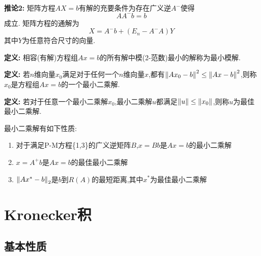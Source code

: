 \documentclass{matrix-review}
\begin{document}
\textbf{推论2\important :} 矩阵方程$AX=b$有解的充要条件为存在广义逆$A^-$使得\begin{equation}
    AA^-b=b
\end{equation}成立. 矩阵方程的通解为\begin{equation}
    X=A^-b+(E_n-A^-A)Y
\end{equation}其中$Y$为任意符合尺寸的向量.

\textbf{定义:} 相容(有解)方程组$Ax=b$的所有解中模(2-范数)最小的解称为最小模解.

\textbf{定义:} 若$n$维向量$x_0$满足对于任何一个$n$维向量$x$,都有$\left\lVert Ax_0-b \right\rVert^2\le\left\lVert Ax-b \right\rVert^2$,则称$x_0$是方程组$Ax=b$的一个最小二乘解.

\textbf{定义:} 若对于任意一个最小二乘解$x_0$,最小二乘解$u$都满足$\left\lVert u \right\rVert\le\left\lVert x_0 \right\rVert$,则称$u$为最佳最小二乘解.

最小二乘解有如下性质:
\begin{enumerate}
    \item 对于满足P-M方程\{1,3\}的广义逆矩阵$B$,$x=Bb$是$Ax=b$的最小二乘解
    \item $x=A^+b$是$Ax=b$的最佳最小二乘解 \important
    \item $\left\lVert Ax^*-b \right\rVert_2$是$b$到$R(A)$的最短距离,其中$x^*$为最佳最小二乘解 \important
\end{enumerate}


\section{Kronecker积}
\subsection{基本性质}
\newcommand{\OT}[2]{#1 \otimes #2}
\newcommand{\OTL}[2]{\left(#1\right) \otimes #2}
\newcommand{\OTR}[2]{#1 \otimes \left(#2\right)}
\newcommand{\OTLR}[2]{\left(#1\right) \otimes \left(#2\right)}
\end{document}
